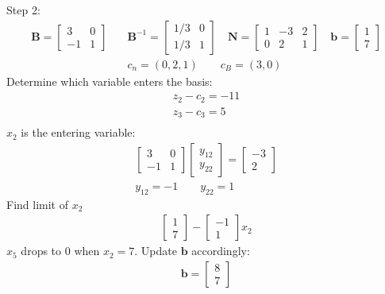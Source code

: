 \documentclass[12pt]{amsart}
\begin{document}
\vspace{4ex}
Step 2:
\begin{align*}
	\mathbf{B} = \begin{bmatrix} 3 & 0 \\ -1 & 1 \end{bmatrix} \quad &
	\mathbf{B}^{-1} = \begin{bmatrix} 1/3 & 0 \\ 1/3 & 1 \end{bmatrix} \quad
	\mathbf{N} = \begin{bmatrix} 1 & -3 & 2 \\ 0 & 2 & 1 \end{bmatrix} \quad
	\mathbf{b} = \begin{bmatrix} 1 \\ 7 \end{bmatrix} \\ &
	c_n = (0,2,1) \qquad
	c_B = (3,0)
\end{align*}
Determine which variable enters the basis:
\begin{align*}
	z_2 - c_2 = -11 \\
	z_3 - c_3 = 5 \\
\end{align*}
\(x_2\) is the entering variable:
\begin{align*}
	\begin{bmatrix} 3 & 0 \\ -1 & 1 \end{bmatrix}
	\begin{bmatrix} y_{12} \\ y_{22} \end{bmatrix} =
	\begin{bmatrix} -3 \\ 2 \end{bmatrix} \\
	y_{12}=-1 \qquad
	y_{22}=1
\end{align*}
Find limit of \(x_2\)
\begin{align*}
	\begin{bmatrix} 1 \\ 7 \end{bmatrix} -
	\begin{bmatrix} -1 \\ 1 \end{bmatrix}x_2
\end{align*}
\(x_5\) drops to \(0\) when \(x_2 = 7\). Update \(\mathbf{b}\) accordingly:
\begin{align*}
	\mathbf{b} = \begin{bmatrix} 8 \\ 7 \end{bmatrix} 
\end{align*}
\end{document}
